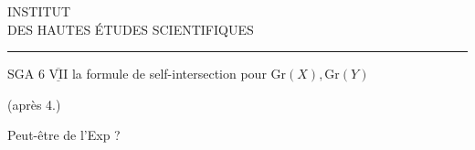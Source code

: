 \begin{center}
INSTITUT\\
DES HAUTES ÉTUDES SCIENTIFIQUES\\[-.4ex]
\rule{1.4cm}{.4pt}
\end{center}

SGA 6 $\overline{\underline{\mathrm{VII}}}$ \qquad {} la formule de self-intersection pour $\mathrm{Gr}(X),\mathrm{Gr}(Y)$

(après 4.)

Peut-être  de l'Exp ?
